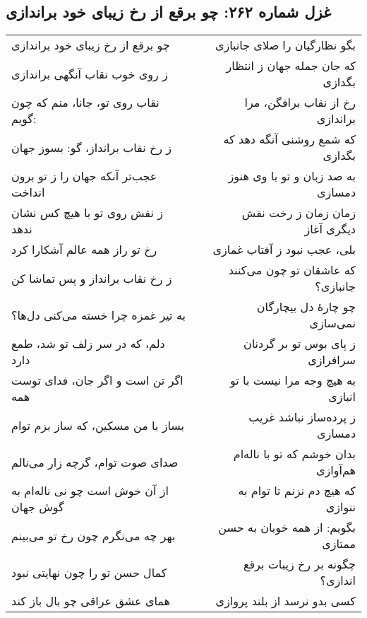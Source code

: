 \begin{center}
\section*{غزل شماره ۲۶۲: چو برقع از رخ زیبای خود براندازی}
\label{sec:262}
\begin{longtable}{l p{0.5cm} r}
چو برقع از رخ زیبای خود براندازی
&&
بگو نظارگیان را صلای جانبازی
\\
ز روی خوب نقاب آنگهی براندازی
&&
که جان جمله جهان ز انتظار بگدازی
\\
نقاب روی تو، جانا، منم که چون گویم:
&&
رخ از نقاب برافگن، مرا براندازی
\\
ز رخ نقاب برانداز، گو: بسوز جهان
&&
که شمع روشنی آنگه دهد که بگدازی
\\
عجب‌تر آنکه جهان را ز تو برون انداخت
&&
به صد زبان و تو با وی هنوز دمسازی
\\
ز نقش روی تو با هیچ کس نشان ندهد
&&
زمان زمان ز رخت نقش دیگری آغاز
\\
رخ تو راز همه عالم آشکارا کرد
&&
بلی، عجب نبود ز آفتاب غمازی
\\
ز رخ نقاب برانداز و پس تماشا کن
&&
که عاشقان تو چون می‌کنند جانبازی؟
\\
به تیر غمزه چرا خسته می‌کنی دل‌ها؟
&&
چو چارهٔ دل بیچارگان نمی‌سازی
\\
دلم، که در سر زلف تو شد، طمع دارد
&&
ز پای بوس تو بر گردنان سرافرازی
\\
اگر تن است و اگر جان، فدای توست همه
&&
به هیچ وجه مرا نیست با تو انبازی
\\
بساز با من مسکین، که ساز بزم توام
&&
ز پرده‌ساز نباشد غریب دمسازی
\\
صدای صوت توام، گرچه زار می‌نالم
&&
بدان خوشم که تو با ناله‌ام هم‌آوازی
\\
از آن خوش است چو نی ناله‌ام به گوش جهان
&&
که هیچ دم نزنم تا توام به ننوازی
\\
بهر چه می‌نگرم چون رخ تو می‌بینم
&&
بگویم: از همه خوبان به حسن ممتازی
\\
کمال حسن تو را چون نهایتی نبود
&&
چگونه بر رخ زیبات برقع اندازی؟
\\
همای عشق عراقی چو بال باز کند
&&
کسی بدو نرسد از بلند پروازی
\\
\end{longtable}
\end{center}
